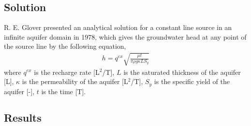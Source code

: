 \subsection{Solution}

R. E. Glover \cite{Glover:74} presented an analytical solution for a constant line source in an infinite aquifer domain in 1978, which gives the groundwater head at any point of the source line by the following equation,
%
\begin{eqnarray}
h = q^{ex}\sqrt{ \frac{\mu t}{\pi \rho g \kappa L S_y}} 
\label{GW_Glover}
\end{eqnarray}
%
where $q^{ex}$ is the recharge rate [L$^2$/T], $L$ is the saturated thickness of the aquifer [L], $\kappa$ is the permeability of the aquifer [L$^2$/T], $S_y$ is the specific yield of the aquifer [-], $t$ is the time [T].

\subsection{Results}

